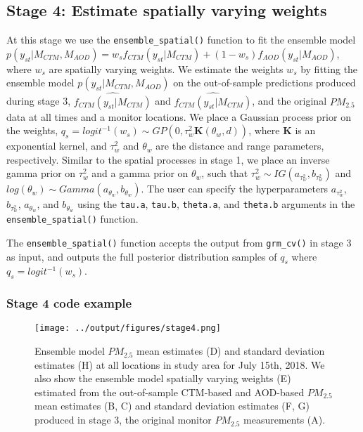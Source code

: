 \documentclass[12pt]{article}
\newcommand{\bl}{\mathbf}
\begin{document}
\subsection*{Stage 4: Estimate spatially varying weights}

At this stage we use the \texttt{ensemble\_spatial()} function to fit the ensemble model  $p(y_{st} | M_{CTM}, M_{AOD}) = w_s f_{CTM}(y_{st} | M_{CTM}) + (1-w_s) f_{AOD}(y_{st}|M_{AOD})$, where $w_s$ are spatially varying weights.
We estimate the weights $w_s$ by fitting the ensemble model $p(y_{st} | M_{CTM}, M_{AOD})$ on the out-of-sample predictions produced during stage 3, $\widehat{f_{CTM}(y_{st} | M_{CTM})}$ and $\widehat{f_{CTM}(y_{st} | M_{CTM})}$, and the original $PM_{2.5}$ data at all times and a monitor locations.
We place a Gaussian process prior on the weights, $q_s = logit^{-1}(w_s) \sim GP(0, \tau^2_w  \bl{K}(\theta_w, d))$, where $\bl{K}$ is an exponential kernel, and $\tau^2_w$ and $\theta_w$ are the distance and range parameters, respectively.
Similar to the spatial processes in stage 1, we place an inverse gamma prior on $\tau^2_w$ and a gamma prior on $\theta_w$, such that $\tau^2_w \sim IG(a_{\tau^2_w}, b_{\tau^2_w})$ and $log(\theta_w) \sim Gamma(a_{\theta_w}, b_{\theta_w})$.
The user can specify the hyperparameters $a_{\tau^2_w}$, $b_{\tau^2_w}$, $a_{\theta_w}$, and $b_{\theta_w}$ using the \texttt{tau.a}, \texttt{tau.b}, \texttt{theta.a}, and \texttt{theta.b} arguments in the \texttt{ensemble\_spatial()} function.

The \texttt{ensemble\_spatial()} function accepts the output from \texttt{grm\_cv()} in stage 3 as input, and outputs the full posterior distribution samples of $q_s$ where $q_s = logit^{-1}(w_s)$. 

\subsubsection*{Stage 4 code example}

\begin{figure}[ht]
    \centering
    \texttt{[image: ../output/figures/stage4.png]}
    \caption{Ensemble model $PM_{2.5}$ mean estimates (D) and standard deviation estimates (H) at all locations in study area for July 15th, 2018. We also show the ensemble model spatially varying weights (E) estimated from the out-of-sample CTM-based and AOD-based $PM_{2.5}$ mean estimates (B, C) and standard deviation estimates (F, G) produced in stage 3, the original monitor $PM_{2.5}$ measurements (A).}
    \label{fig:stage4}
\end{figure}
\end{document}
